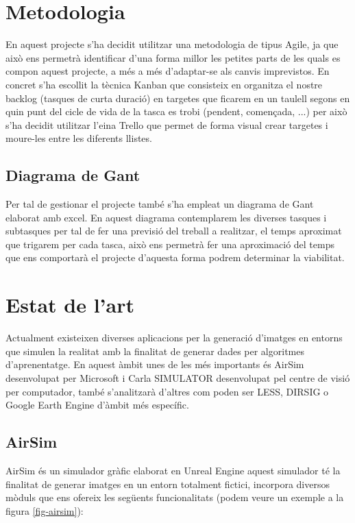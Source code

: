 \documentclass[10pt,a4paper,twocolumn,twoside]{article}
\begin{document}
\section{Metodologia}

En aquest projecte s'ha decidit utilitzar una metodologia de tipus Agile\cite{agile}, ja que això ens permetrà identificar d'una forma millor les petites parts de les quals es compon aquest projecte, a més a més d'adaptar-se als canvis imprevistos. En concret s'ha escollit la tècnica Kanban\cite{kanban} que consisteix en organitza el nostre backlog (tasques de curta duració) en
targetes que ficarem en un taulell segons en quin punt del cicle de vida de la tasca es trobi (pendent, començada, ...) per això s'ha decidit utilitzar l'eina Trello\cite{trello} que permet de forma visual crear targetes i moure-les entre les diferents llistes.

\subsection{Diagrama de Gant}

Per tal de gestionar el projecte també s'ha empleat un diagrama de Gant elaborat amb excel. En aquest diagrama contemplarem les diverses tasques i subtasques per tal de fer una previsió del treball a realitzar, el temps aproximat que trigarem per cada tasca, això ens permetrà fer una aproximació del temps que ens comportarà el projecte d'aquesta forma podrem determinar la viabilitat.

\section{Estat de l'art}
\label{estatart}

Actualment existeixen diverses aplicacions per la generació d'imatges en entorns que simulen la realitat amb la finalitat de generar dades per algoritmes d'aprenentatge.
En aquest àmbit unes de les més importants és AirSim\cite{airsim} desenvolupat per Microsoft i Carla SIMULATOR\cite{carla} desenvolupat pel centre de visió per computador, també s'analitzarà  d'altres com poden ser LESS\cite{less}, DIRSIG\cite{dirsig} o Google Earth Engine\cite{googleearth} d'àmbit més específic. 

\subsection{AirSim}
AirSim és un simulador gràfic elaborat en Unreal Engine\cite{unreal} aquest simulador té la finalitat de generar imatges en un entorn totalment fictici, incorpora diversos mòduls que ens ofereix les següents funcionalitats (podem veure un exemple a la figura \ref{fig-airsim}):
\end{document}
